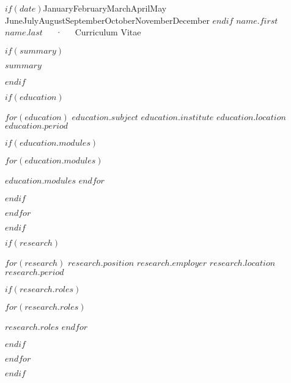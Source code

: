 \documentclass[12pt, letterpaper]{awesome-cv}
\begin{document}
\makecvheader

\makecvfooter
  {$if(date)${\ifcase \month \or January\or February\or March\or April\or May%
\or June\or July\or August\or September\or October\or November\or December\fi%
\space \number \year}$endif$}
  {$name.first$ $name.last$~~~·~~~Curriculum Vitae}
  {\thepage}



$if(summary)$
  \begin{cvparagraph}

    $summary$
  \end{cvparagraph}
$endif$

$if(education)$
  \begin{cventries}

    $for(education)$
      \cventry
      {$education.subject$}
      {$education.institute$}
      {$education.location$}
      {$education.period$}
      {
        $if(education.modules)$
          \begin{cvitems}
            $for(education.modules)$
              \item {$education.modules$}
            $endfor$
          \end{cvitems}
        $endif$
      }

    $endfor$
  \end{cventries}
$endif$

$if(research)$
  \begin{cventries}

    $for(research)$
      \cventry
      {$research.position$}
      {$research.employer$}
      {$research.location$}
      {$research.period$}
      {
        $if(research.roles)$
          \begin{cvitems}
            $for(research.roles)$
              \item {$research.roles$}
            $endfor$
          \end{cvitems}
        $endif$
      }

    $endfor$
  \end{cventries}
$endif$
\end{document}
